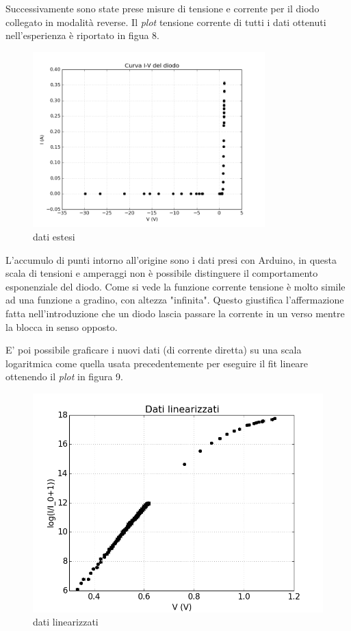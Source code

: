 \documentclass[a4paper,10pt]{article}
\begin{document}
Successivamente sono state prese misure di tensione e corrente per il diodo collegato in modalità reverse. Il \emph{plot} tensione corrente di tutti i dati ottenuti nell'esperienza è riportato in figua 8.

\begin{figure}[!htb]
\begin{center}
\includegraphics[width=0.8\textwidth]{curvaiv_2.png}
\end{center}
\caption{dati estesi}
\end{figure}

L'accumulo di punti intorno all'origine sono i dati presi con Arduino, in questa scala di tensioni e amperaggi non è possibile distinguere il comportamento esponenziale del diodo. Come si vede la funzione corrente tensione è molto simile ad una funzione a gradino, con altezza "infinita". Questo giustifica l'affermazione fatta nell'introduzione che un diodo lascia passare la corrente in un verso mentre la blocca in senso opposto.

E' poi possibile graficare i nuovi dati (di corrente diretta) su una scala logaritmica come quella usata precedentemente per eseguire il fit lineare ottenendo il \emph{plot} in figura 9.
\\
\begin{figure}[!htb]
\begin{center}
\includegraphics[width=\textwidth]{lin1.png}
\end{center}
\caption{dati linearizzati}
\end{figure}
\\
\end{document}
